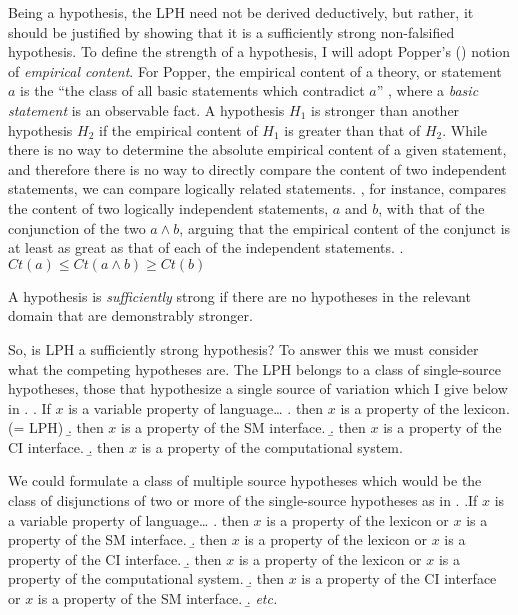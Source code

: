 \documentclass[MilwayThesis]{subfiles}
\begin{document}
Being a hypothesis, the LPH need not be derived deductively, but rather, it should be justified by showing that it is a sufficiently strong non-falsified hypothesis.
To define the strength of a hypothesis, I will adopt Popper's (\citeyear{popper1959logic,popper2014conjectures}) notion of \textit{empirical content}.
For Popper, the empirical content of a theory, or statement $a$ is the ``the class of all basic statements which contradict $a$'' \parencite[315]{popper2014conjectures}, where a \textit{basic statement} is an observable fact.
A hypothesis $H_1$ is stronger than another hypothesis $H_2$ if the empirical content of $H_1$ is greater than that of $H_2$.
While there is no way to determine the absolute empirical content of a given statement, and therefore there is no way to directly compare the content of two independent statements, we can compare logically related statements.
\textcite[295]{popper2014conjectures}, for instance, compares the content of two logically independent statements, $a$ and $b$, with that of the conjunction of the two $a\wedge b$, arguing that the empirical content of the conjunct is at least as great as that of each of the independent statements.
\ex. $Ct(a) \leq Ct(a\wedge b) \geq Ct(b)$

A hypothesis is \textit{sufficiently} strong if there are no hypotheses in the relevant domain that are demonstrably stronger.

So, is LPH a sufficiently strong hypothesis?
To answer this we must consider what the competing hypotheses are.
The LPH belongs to a class of single-source hypotheses, those that hypothesize a single source of variation which I give below in \Next.
\ex. If $x$ is a variable property of language\ldots
\a. then $x$ is a property of the lexicon. (= LPH)
\b. then $x$ is a property of the SM interface.
\b. then $x$ is a property of the CI interface.
\b. then $x$ is a property of the computational system.

We could formulate a class of multiple source hypotheses which would be the class of disjunctions of two or more of the single-source hypotheses as in \Next.
\ex.If $x$ is a variable property of language\ldots
\a. then $x$ is a property of the lexicon or $x$ is a property of the SM interface.
\b. then $x$ is a property of the lexicon or $x$ is a property of the CI interface. 
\b. then $x$ is a property of the lexicon or $x$ is a property of the computational system. 
\b. then $x$ is a property of the CI interface or $x$ is a property of the SM interface.
\b. \textit{etc.} 
\end{document}
